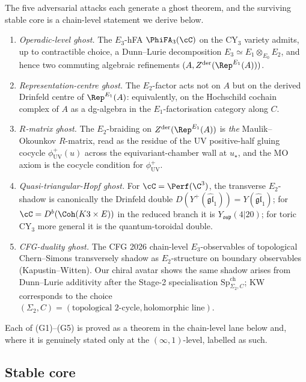 The five adversarial attacks each generate a ghost theorem, and the
surviving stable core is a chain-level statement we derive below.

\begin{enumerate}[label=\textup{(G\arabic*)}]
 \item \emph{Operadic-level ghost.} The $E_3$-hFA $\PhiFA_3(\cC)$ on
 the CY$_3$ variety admits, up to contractible choice, a Dunn--Lurie
 decomposition $E_3 \simeq E_1 \otimes_{E_0} E_2$, and hence two
 commuting algebraic refinements $(A, Z^{\mathrm{der}}(\Rep^{E_1}(A)))$.
 \item \emph{Representation-centre ghost.} The $E_2$-factor acts not on
 $A$ but on the derived Drinfeld centre of $\Rep^{E_1}(A)$:
 equivalently, on the Hochschild cochain complex of $A$ as a dg-algebra
 in the $E_1$-factorisation category along $C$.
 \item \emph{$R$-matrix ghost.} The $E_2$-braiding on
 $Z^{\mathrm{der}}(\Rep^{E_1}(A))$ is \emph{the} Maulik--Okounkov
 $R$-matrix, read as the residue of the UV positive-half gluing cocycle
 $\phi^+_{\mathrm{UV}}(u)$ across the equivariant-chamber wall at
 $u_\star$, and the MO axiom is the cocycle condition for
 $\phi^+_{\mathrm{UV}}$.
 \item \emph{Quasi-triangular-Hopf ghost.} For $\cC = \Perf(\C^3)$, the
 transverse $E_2$-shadow is canonically the Drinfeld double
 $D(Y^+(\widehat{\mathfrak{gl}}_1)) = Y(\widehat{\mathfrak{gl}}_1)$;
 for $\cC = D^b(\Coh(K3 \times E))$ in the reduced branch it is
 $Y_{\mathfrak{osp}}(4|20)$; for toric CY$_3$ more general it is the
 quantum-toroidal double.
 \item \emph{CFG-duality ghost.} The CFG 2026 chain-level
 $E_3$-observables of topological Chern--Simons transversely shadow as
 $E_2$-structure on boundary observables (Kapustin--Witten).  Our
 chiral avatar shows the same shadow arises from Dunn--Lurie additivity
 after the Stage-2 specialisation
 $\mathrm{Sp}^{\mathrm{ch}}_{\Sigma_2, C}$; KW corresponds to the
 choice $(\Sigma_2, C) = (\text{topological 2-cycle},
 \text{holomorphic line})$.
\end{enumerate}

Each of (G1)--(G5) is proved as a theorem in the chain-level lane
below and, where it is genuinely stated only at the $(\infty, 1)$-level,
labelled as such.

\subsection*{Stable core}

